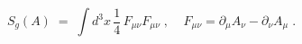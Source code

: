 \begin{equation}\label{eq:defsg}
S_g (A) \;=\;\int d^3x \, \frac{1}{4} \, F_{\mu\nu} F_{\mu\nu} \;,
\;\;\;\; F_{\mu\nu}=\partial_\mu A_\nu - \partial_\nu A_\mu \;.
\end{equation}

